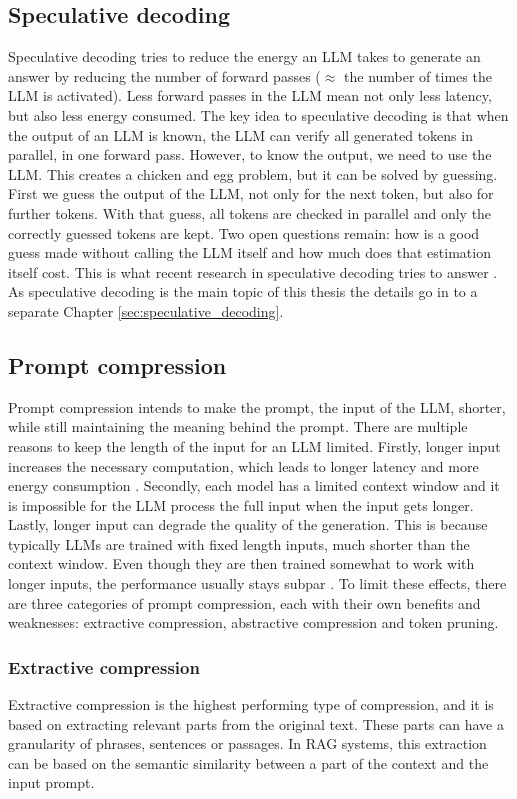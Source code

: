 \subsection{Speculative decoding}
Speculative decoding tries to reduce the energy an LLM takes to generate an answer by reducing the number of forward passes ($\approx$ the number of times the LLM is activated). Less forward passes in the LLM mean not only less latency, but also less energy consumed. The key idea to speculative decoding is that when the output of an LLM is known, the LLM can verify all generated tokens in parallel, in one forward pass. However, to know the output, we need to use the LLM. This creates a chicken and egg problem, but it can be solved by guessing. First we guess the output of the LLM, not only for the next token, but also for further tokens. With that guess, all tokens are checked in parallel and only the correctly guessed tokens are kept. Two open questions remain: how is a good guess made without calling the LLM itself and how much does that estimation itself cost. This is what recent research in speculative decoding tries to answer \cite{he2023rest, li2024eagle}. As speculative decoding is the main topic of this thesis the details go in to a separate Chapter \ref{sec:speculative_decoding}.

\subsection{Prompt compression}
Prompt compression intends to make the prompt, the input of the LLM, shorter, while still maintaining the meaning behind the prompt. There are multiple reasons to keep the length of the input for an LLM limited. Firstly, longer input increases the necessary computation, which leads to longer latency and more energy consumption \cite{kim2023arithmeticintensityllm}. Secondly, each model has a limited context window and it is impossible for the LLM process the full input when the input gets longer. Lastly, longer input can degrade the quality of the generation. This is because typically LLMs are trained with fixed length inputs, much shorter than the context window. Even though they are then trained somewhat to work with longer inputs, the performance usually stays subpar \cite{levy2024sameinputlength, liu2024lost}. To limit these effects, there are three categories of prompt compression, each with their own benefits and weaknesses: extractive compression, abstractive compression and token pruning.

\subsubsection{Extractive compression}
Extractive compression is the highest performing type of compression, and it is based on extracting relevant parts from the original text. These parts can have a granularity of phrases, sentences or passages. In RAG systems, this extraction can be based on the semantic similarity between a part of the context and the input prompt. 

